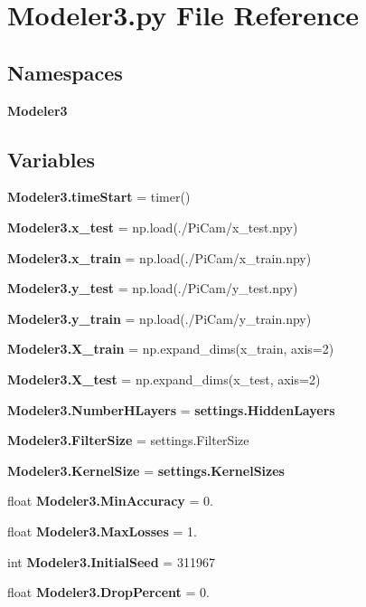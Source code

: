 \section{Modeler3.\+py File Reference}
\label{_modeler3_8py}
\subsection*{Namespaces}
\begin{DoxyCompactItemize}
\item 
 \textbf{ Modeler3}
\end{DoxyCompactItemize}
\subsection*{Variables}
\begin{DoxyCompactItemize}
\item 
\textbf{ Modeler3.\+time\+Start} = timer()
\item 
\textbf{ Modeler3.\+x\+\_\+test} = np.\+load(\textquotesingle{}./Pi\+Cam/x\+\_\+test.\+npy\textquotesingle{})
\item 
\textbf{ Modeler3.\+x\+\_\+train} = np.\+load(\textquotesingle{}./Pi\+Cam/x\+\_\+train.\+npy\textquotesingle{})
\item 
\textbf{ Modeler3.\+y\+\_\+test} = np.\+load(\textquotesingle{}./Pi\+Cam/y\+\_\+test.\+npy\textquotesingle{})
\item 
\textbf{ Modeler3.\+y\+\_\+train} = np.\+load(\textquotesingle{}./Pi\+Cam/y\+\_\+train.\+npy\textquotesingle{})
\item 
\textbf{ Modeler3.\+X\+\_\+train} = np.\+expand\+\_\+dims(x\+\_\+train, axis=2)
\item 
\textbf{ Modeler3.\+X\+\_\+test} = np.\+expand\+\_\+dims(x\+\_\+test, axis=2)
\item 
\textbf{ Modeler3.\+Number\+H\+Layers} = \textbf{ settings.\+Hidden\+Layers}
\item 
\textbf{ Modeler3.\+Filter\+Size} = settings.\+Filter\+Size
\item 
\textbf{ Modeler3.\+Kernel\+Size} = \textbf{ settings.\+Kernel\+Sizes}
\item 
float \textbf{ Modeler3.\+Min\+Accuracy} = 0.
\item 
float \textbf{ Modeler3.\+Max\+Losses} = 1.
\item 
int \textbf{ Modeler3.\+Initial\+Seed} = 311967
\item 
float \textbf{ Modeler3.\+Drop\+Percent} = 0.
\item 

\end{DoxyCompactItemize}
